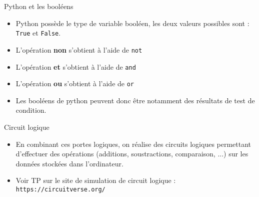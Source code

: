 \documentclass[10pt]{beamer}
\begin{document}
\begin{frame}
	\mframe{\Arch}
	\begin{block}{Python et les booléens}
		\begin{itemize}
			\item<1-> Python possède le type de variable booléen, les deux valeurs possibles sont : \texttt{True} et \texttt{False}.
			\item<2-> L'opération \textbf{non} s'obtient à l'aide de \texttt{not}
			\item<3-> L'opération \textbf{et} s'obtient à l'aide de \texttt{and}
			\item<4-> L'opération \textbf{ou} s'obtient à l'aide de \texttt{or}
			\item<5-> Les booléens de python peuvent donc être notamment des résultats de test de condition.
		\end{itemize}
	\end{block}
\end{frame}

\begin{frame}
	\mframe{\Arch}
	\begin{alertblock}{Circuit logique}
		\begin{itemize}
			\item<1-> En combinant ces portes logiques, on réalise des circuits logiques permettant d'effectuer des opérations (additions, soustractions, comparaison, ...) sur les données stockées dans l'ordinateur.
			\item<2-> Voir TP sur le site de simulation de circuit logique : {\tt https://circuitverse.org/}
		\end{itemize}
	\end{alertblock}
\end{frame}
\end{document}
